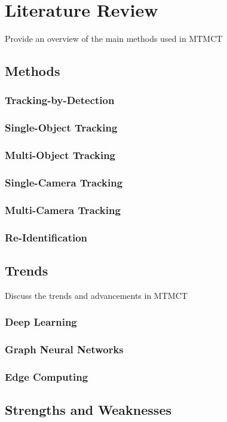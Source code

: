 \chapter{Literature Review}\label{chap:literature_review}
Provide an overview of the main methods used in MTMCT

\section{Methods}\label{sec:methods}

\subsection{Tracking-by-Detection}\label{subsec:tracking-by-detection}

\subsection{Single-Object Tracking}\label{subsec:single-object_tracking}

\subsection{Multi-Object Tracking}\label{subsec:multi-object_tracking}

\subsection{Single-Camera Tracking}\label{subsec:single-camera_tracking}

\subsection{Multi-Camera Tracking}\label{subsec:multi-camera_tracking}

\subsection{Re-Identification}\label{subsec:re-identification}

\section{Trends}\label{sec:trends}
Discuss the trends and advancements in MTMCT

\subsection{Deep Learning}\label{subsec:deep_learning}

\subsection{Graph Neural Networks}\label{subsec:graph_neural_networks}

\subsection{Edge Computing}\label{subsec:edge_computing}

\section{Strengths and Weaknesses}\label{sec:strengths_and_weaknesses}
